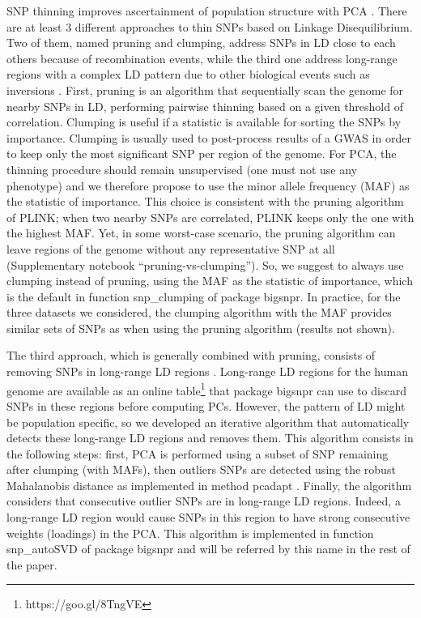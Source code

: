 \documentclass{bioinfo}
\begin{document}
\begin{methods}
SNP thinning improves ascertainment of population structure with PCA \cite[]{Abdellaoui2013}. There are at least 3 different approaches to thin SNPs based on Linkage Disequilibrium. Two of them, named pruning and clumping, address SNPs in LD close to each others because of recombination events, while the third one address long-range regions with a complex LD pattern due to other biological events such as inversions \cite[]{Price2008}. 
First, pruning is an algorithm that sequentially scan the genome for nearby SNPs in LD, performing pairwise thinning based on a given threshold of correlation.
{\color{red}
Clumping is useful if a statistic is available for sorting the SNPs by importance. Clumping is usually used to post-process results of a GWAS in order to keep only the most significant SNP per region of the genome. 
For PCA, the thinning procedure should remain unsupervised (one must not use any phenotype) and we therefore propose to use the minor allele frequency (MAF) as the statistic of importance. 
This choice is consistent with the pruning algorithm of PLINK; when two nearby SNPs are correlated, PLINK keeps only the one with the highest MAF.
Yet, in some worst-case scenario, the pruning algorithm can leave regions of the genome without any representative SNP at all (Supplementary notebook ``pruning-vs-clumping''). 
So, we suggest to always use clumping instead of pruning, using the MAF as the statistic of importance, which is the default in function snp\_clumping of package bigsnpr. In practice, for the three datasets we considered, the clumping algorithm with the MAF provides similar sets of SNPs as when using the pruning algorithm (results not shown).
}

The third approach, which is generally combined with pruning, consists of removing SNPs in long-range LD regions \cite[]{Price2008}. Long-range LD regions for the human genome are available as an online table\footnote{https://goo.gl/8TngVE} that package bigsnpr can use to discard SNPs in these regions before computing PCs. 
However, the pattern of LD might be population specific, so we developed an iterative algorithm that automatically detects these long-range LD regions and removes them. This algorithm consists in the following steps: first, PCA is performed using a subset of SNP remaining after clumping (with MAFs), then outliers SNPs are detected using the robust Mahalanobis distance as implemented in method pcadapt \cite[]{Luu2017}. Finally, the algorithm considers that consecutive outlier SNPs are in long-range LD regions. Indeed, a long-range LD region would cause SNPs in this region to have strong consecutive weights (loadings) in the PCA. This algorithm is implemented in function snp\_autoSVD of package bigsnpr and will be referred by this name in the rest of the paper.



\end{methods}
\end{document}
